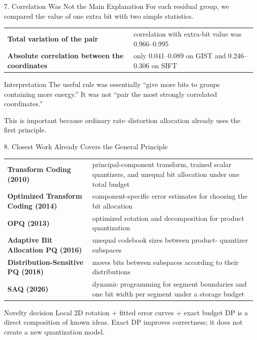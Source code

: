 \documentclass[aspectratio=169]{beamer}
\begin{document}
\begin{frame}{7. Correlation Was Not the Main Explanation}
\small
For each residual group, we compared the value of one extra bit with two
simple statistics.
\begin{center}
\begin{tabularx}{0.88\textwidth}{>{\bfseries}p{}X}
Total variation of the pair & correlation with extra-bit value was
0.966--0.995\\
Absolute correlation between the coordinates & only 0.041--0.089 on GIST and
0.246--0.306 on SIFT\\
\end{tabularx}
\end{center}
\begin{alertblock}{Interpretation}
The useful rule was essentially ``give more bits to groups containing more
energy.'' It was not ``pair the most strongly correlated coordinates.''
\end{alertblock}
This is important because ordinary rate--distortion allocation already uses
the first principle.
\end{frame}

\begin{frame}{8. Closest Work Already Covers the General Principle}
\footnotesize
\begin{tabularx}{\textwidth}{>{\bfseries}p{}X}
Transform Coding (2010) & principal-component transform, trained scalar
quantizers, and unequal bit allocation under one total budget\\
Optimized Transform Coding (2014) & component-specific error estimates for
choosing the bit allocation\\
OPQ (2013) & optimized rotation and decomposition for product quantization\\
Adaptive Bit Allocation PQ (2016) & unequal codebook sizes between product-
quantizer subspaces\\
Distribution-Sensitive PQ (2018) & moves bits between subspaces according to
their distributions\\
SAQ (2026) & dynamic programming for segment boundaries and one bit width per
segment under a storage budget\\
\end{tabularx}
\begin{alertblock}{Novelty decision}
Local 2D rotation + fitted error curves + exact budget DP is a direct
composition of known ideas. Exact DP improves correctness; it does not create
a new quantization model.
\end{alertblock}
\end{frame}
\end{document}
